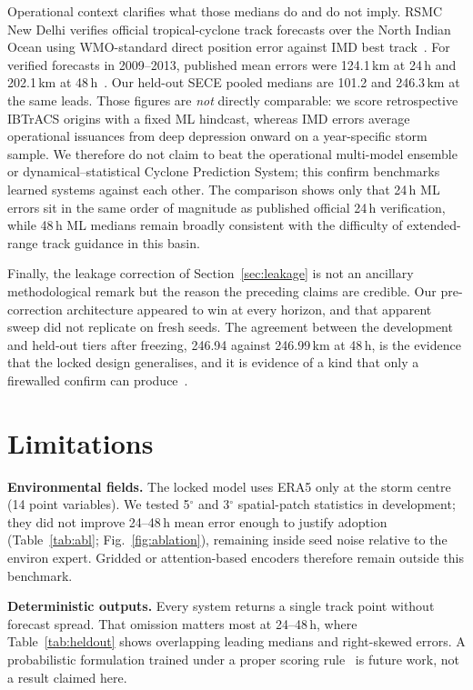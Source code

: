 \documentclass{ametsocv6.1}
\newcommand{\sece}{SECE}
\newcommand{\era}{ERA5}
\begin{document}
Operational context clarifies what those medians do and do not imply. RSMC New
Delhi verifies official tropical-cyclone track forecasts over the North Indian
Ocean using WMO-standard direct position error against IMD best
track~\citep{mohapatra2013imdtrack}. For verified forecasts in 2009--2013,
published mean errors were 124.1\,km at 24\,h and 202.1\,km at
48\,h~\citep{mohapatra2013imdtrack}. Our held-out \sece{} pooled medians are
101.2 and 246.3\,km at the same leads. Those figures are \emph{not} directly
comparable: we score retrospective IBTrACS origins with a fixed ML hindcast, whereas
IMD errors average operational issuances from deep depression onward on a
year-specific storm sample. We therefore do not claim to beat the operational
multi-model ensemble or dynamical--statistical Cyclone Prediction System; this
confirm benchmarks learned systems against each other. The comparison shows only
that 24\,h ML errors sit in the same order of magnitude as published official
24\,h verification, while 48\,h ML medians remain broadly consistent with the
difficulty of extended-range track guidance in this basin.

Finally, the leakage correction of Section~\ref{sec:leakage} is not an ancillary
methodological remark but the reason the preceding claims are credible. Our
pre-correction architecture appeared to win at every horizon, and that apparent
sweep did not replicate on fresh seeds. The agreement between the development and
held-out tiers after freezing, 246.94 against 246.99\,km at 48\,h, is the evidence
that the locked design generalises, and it is evidence of a kind that only a
firewalled confirm can produce~\citep{cawley2010}.


\FloatBarrier
\section{Limitations}
\label{sec:limits}

\textbf{Environmental fields.} The locked model uses \era{} only at the storm
centre (14 point variables). We tested 5$^\circ$ and 3$^\circ$ spatial-patch
statistics in development; they did not improve 24--48\,h mean error enough to
justify adoption (Table~\ref{tab:abl}; Fig.~\ref{fig:ablation}), remaining
inside seed noise relative to the environ expert. Gridded or attention-based
encoders therefore remain outside this benchmark.

\textbf{Deterministic outputs.} Every system returns a single track point
without forecast spread. That omission matters most at 24--48\,h, where
Table~\ref{tab:heldout} shows overlapping leading medians and right-skewed
errors. A probabilistic formulation trained under a proper scoring
rule~\citep{gneiting2007} is future work, not a result claimed here.
\end{document}
